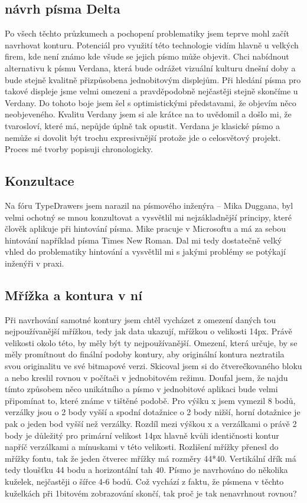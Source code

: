 \documentclass[a4paper]{article}
\begin{document}
\begin{enumerate}
\section{návrh písma Delta}
Po všech těchto průzkumech a pochopení problematiky jsem teprve mohl začít navrhovat konturu. Potenciál pro využití této technologie vidím hlavně u velkých firem, kde není známo kde všude se jejich písmo může objevit. Chci nabídnout alternativu k písmu Verdana, která bude odrážet vizuální kulturu dnešní doby a bude stejně kvalitně přizpůsobena jednobitovým displejům. Při hledání písma pro takové displeje jsme velmi omezeni a pravděpodobně nejčastěji stejně skončíme u Verdany. Do tohoto boje jsem šel s optimistickými představami, že objevím něco neobjeveného. Kvalitu Verdany jsem si ale krátce na to uvědomil a došlo mi, že tvarosloví, které má, nepůjde úplně tak opustit. Verdana je klasické písmo a nemůže si dovolit být trochu expresivnější protože jde o celosvětový projekt. Proces mé tvorby popisuji chronologicky.

\subsection{Konzultace}
Na fóru TypeDrawers jsem narazil na písmového inženýra – Mika Duggana, byl velmi ochotný se mnou konzultovat a vysvětlil mi nejzákladnější principy, které člověk aplikuje při hintování písma. Mike pracuje v Microsoftu a má za sebou hintování například písma Times New Roman. Dal mi tedy dostatečně velký vhled do problematiky hintování a vysvětlil mi s jakými problémy se potýkají inženýři v praxi.

\subsection{Mřížka a kontura v ní}
Při navrhování samotné kontury jsem chtěl vycházet z omezení daných tou nejpoužívanější mřížkou, tedy jak data ukazují, mřížkou o velikosti 14px. Právě velikosti okolo této, by měly být ty nejpoužívanější. Omezení, která určuje, by se měly promítnout do finální podoby kontury, aby originální kontura neztratila svou originalitu ve své bitmapové verzi. Skicoval jsem si do čtverečkovaného bloku a nebo kreslil rovnou v počítači v jednobitovém režimu. Doufal jsem, že najdu tímto způsobem něco unikátního a písmo v jednobitové aplikaci bude velmi připomínat to, které známe v tištěné podobě. Pro výšku x jsem vymezil 8 bodů, verzálky jsou o 2 body vyšší a spodní dotažnice o 2 body nižší, horní dotažnice je pak o jeden bod vyšší než verzálky. Rozdíl mezi výškou x a verzálkami o právě 2 body je důležitý pro primární velikost 14px hlavně kvůli identičnosti kontur napříč verzálkami a mínuskami v této velikosti. Rozlišení mřížky přenesl do mřížky fontu, tak že jeden čtverec mřížky má rozměry 44*40. Vertikální dřík má tedy tloušťku 44 bodu a horizontální tah 40. Písmo je navrhováno do několika kuželek, nejčastěji o šířce 4-6 bodů. Což vychází z faktu, že písmena v těchto kuželkách při 1bitovém zobrazování skončí, tak proč je tak nenavrhnout rovnou?

\end{enumerate}
\end{document}
